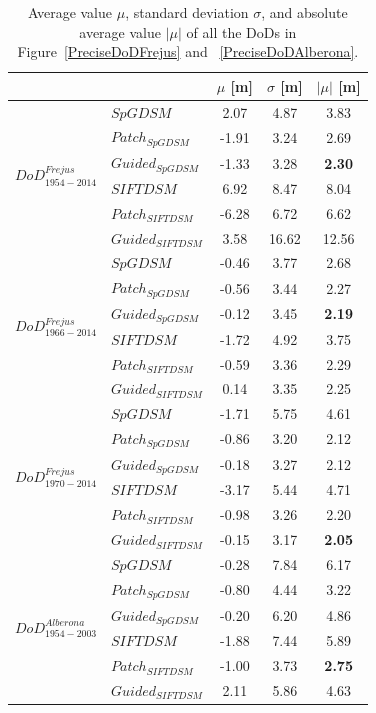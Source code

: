 \begin{table}%
	\footnotesize
	\centering
	\begin{tabular}{||l|l|c|c|c||}\hline
		& &$\mu$ [m]&$\sigma$ [m]&$|\mu|$ [m]\\\hline\hline
\multirow{6}{*}{$DoD^{Frejus}_{1954-2014}$}
&${{SpGDSM}}$ & 2.07 & 4.87 & {3.83} \\
&${Patch_{SpGDSM}}$ & -1.91 & 3.24 & 2.69\\
&${Guided_{SpGDSM}}$ & -1.33 & 3.28 & \textbf{2.30}\\
&${{SIFTDSM}}$ & 6.92 & 8.47 & 8.04\\
&${Patch_{SIFTDSM}}$ & -6.28 & 6.72 & 6.62\\
&${Guided_{SIFTDSM}}$ & 3.58 & 16.62 & 12.56\\\hline

\multirow{6}{*}{$DoD^{Frejus}_{1966-2014}$}
&${{SpGDSM}}$ & -0.46 & 3.77 & {2.68}\\
&${Patch_{SpGDSM}}$ & -0.56 & 3.44 & 2.27\\
&${Guided_{SpGDSM}}$ & -0.12 & 3.45 & \textbf{2.19}\\
&${{SIFTDSM}}$ & -1.72 & 4.92 & 3.75\\
&${Patch_{SIFTDSM}}$ & -0.59 & 3.36 & 2.29\\
&${Guided_{SIFTDSM}}$ & 0.14 & 3.35 & 2.25\\\hline

\multirow{6}{*}{$DoD^{Frejus}_{1970-2014}$}
&${{SpGDSM}}$ & -1.71 & 5.75 & 4.61\\
&${Patch_{SpGDSM}}$ & -0.86 & 3.20 & 2.12\\
&${Guided_{SpGDSM}}$ & -0.18 & 3.27 & 2.12\\
&${{SIFTDSM}}$ & -3.17 & 5.44 & 4.71\\
&${Patch_{SIFTDSM}}$ & -0.98 & 3.26 & 2.20\\
&${Guided_{SIFTDSM}}$ & -0.15 & 3.17 & \textbf{2.05}\\\hline		

\multirow{6}{*}{$DoD^{Alberona}_{1954-2003}$}
&${SpGDSM}$ & -0.28 & 7.84 & 6.17\\
&${Patch_{SpGDSM}}$ & -0.80 & 4.44 & 3.22\\
&${Guided_{SpGDSM}}$ & -0.20 & 6.20 & 4.86\\
&${SIFTDSM}$ & -1.88 & 7.44 & 5.89\\
&${Patch_{SIFTDSM}}$ & -1.00 & 3.73 & \textbf{2.75}\\
&${Guided_{SIFTDSM}}$ & 2.11 & 5.86 & 4.63\\\hline
	\end{tabular}
	\caption{Average value $\mu$, standard deviation $\sigma$, and absolute average value $|\mu|$ of all the \ac{DoD}s in Figure~\ref{PreciseDoDFrejus} and ~\ref{PreciseDoDAlberona}.}
	\label{PreciseDoDStatistic}
\end{table}


